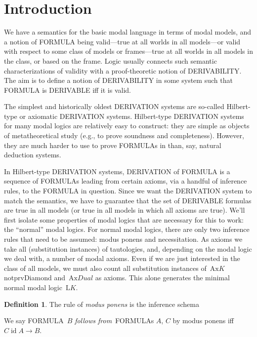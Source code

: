 \documentclass[10pt,a4paper]{article}
\newcommand*{\olup}[1]{\MakeUppercase{#1}}
\theoremstyle{plain}
\theoremstyle{definition}
\newtheorem{defn}[thm]{Definition}
\theoremstyle{remark}
\newcommand*{\olfileid}[3]{}
\newcommand*{\olsection}[1]{\section*{#1}}
\providecommand{\AxiomC}[1]{}
\providecommand{\BinaryInfC}[1]{}
\providecommand{\RightLabel}[1]{}
\newenvironment{prooftree}{}{}
\providecommand{\lif}{\mathbin{\rightarrow}}
\providecommand{\Log}{\ensuremath{\mathrm{L}}}
\providecommand{\iftag}[1]{#1}
\providecommand{\Ax}{\mathrm{Ax}}
\providecommand{\ident}{\operatorname{id}}
\providecommand{\iftag}{}
\begin{document}



\olfileid{nml}{axs}{int}

\olsection{Introduction}

We have a semantics for the basic modal language in terms of modal
models, and a notion of \olup{formula} being valid---true at all worlds
in all models---or valid with respect to some class of models or
frames---true at all worlds in all models in the class, or based on
the frame. Logic usually connects such semantic characterizations of
validity with a proof-theoretic notion of \olup{derivability}. The aim is
to define a notion of \olup{derivability} in some system such that
\olup{formula} is \olup{derivable} iff it is valid.

The simplest and historically oldest \olup{derivation} systems are
so-called Hilbert-type or axiomatic \olup{derivation} systems.
Hilbert-type \olup{derivation} systems for many modal logics are
relatively easy to construct: they are simple as objects of
metatheoretical study (e.g., to prove soundness and
completeness). However, they are much harder to use to prove
\olup{formula}s in than, say, natural deduction systems.

In Hilbert-type \olup{derivation} systems, \olup{derivation} of \olup{formula}
is a sequence of \olup{formula}s leading from certain axioms, via a
handful of inference rules, to the \olup{formula} in question.  Since we
want the \olup{derivation} system to match the semantics, we have to
guarantee that the set of \olup{derivable} formulas are true in all
models (or true in all models in which all axioms are true). We'll
first isolate some properties of modal logics that are necessary for
this to work: the ``normal'' modal logics. For normal modal logics,
there are only two inference rules that need to be assumed: modus
ponens and necessitation.  As axioms we take all (substitution
instances) of tautologies, and, depending on the modal logic we deal
with, a number of modal axioms. Even if we are just interested in the
class of all models, we must also count all substitution instances
of~$\Ax{K}$\iftag{notprvDiamond}{}{ and~$\Ax{Dual}$} as axioms. This
alone generates the minimal normal modal logic~$\Log K$.

\begin{defn}
The rule of \emph{modus ponens} is the inference schema
\begin{prooftree}
\AxiomC{$A$}
\AxiomC{$A \lif B$}
\RightLabel{\MP}
\BinaryInfC{$B$}
\end{prooftree}
We say \olup{formula}~$B$ \emph{follows from}~\olup{formula}s $A$, $C$
by modus ponens iff $C \ident A \lif B$.
\end{defn}
\end{document}

